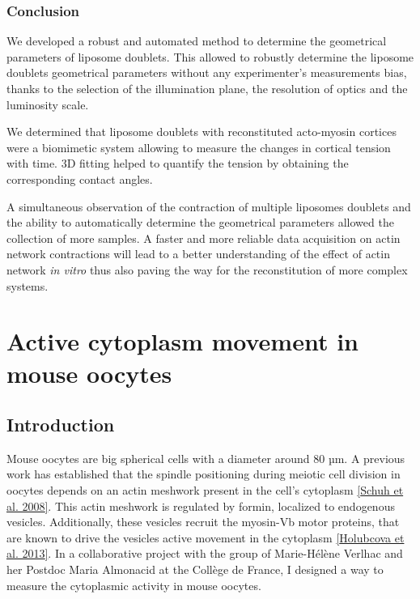 \documentclass[A4paperpaper,11pt,english]{sphinxmanual}
\begin{document}
\subsection{Conclusion}
\label{index-latex:id25}
We developed a robust and automated method to determine the geometrical
parameters of liposome doublets. This allowed to robustly determine the
liposome doublets geometrical parameters without
any experimenter’s measurements bias, thanks to the selection of the illumination plane,
the resolution of optics and the luminosity scale.

We determined that liposome doublets with reconstituted acto-myosin cortices were
a biomimetic system allowing to measure the changes in cortical tension with
time. 3D fitting helped to quantify the tension by obtaining the corresponding contact angles.

A simultaneous observation of the contraction of multiple liposomes doublets and the
ability to automatically determine the geometrical parameters allowed the collection of more
samples. A faster and more reliable data acquisition on actin
network contractions will lead to a better understanding of the effect of actin
network \emph{in vitro} thus also paving the way for the reconstitution of more complex systems.


\chapter{Active cytoplasm movement in mouse oocytes}
\label{index-latex::doc}\label{index-latex:active-cytoplasm-movement-in-mouse-oocytes}

\section{Introduction}
\label{index-latex:introduction}
Mouse oocytes are big spherical cells with a diameter around 80 µm.  A previous work has established
that the spindle positioning during meiotic cell division in oocytes depends
on an actin meshwork present in the cell's cytoplasm {\hyperref[index-latex:schuh2008]{{[}Schuh et al. 2008{]}}}.  This
actin meshwork is regulated by formin, localized to endogenous vesicles.
Additionally, these vesicles recruit the myosin-Vb motor proteins, that are known to drive the vesicles active movement
in the cytoplasm {\hyperref[index-latex:holubcova2013]{{[}Holubcova et al. 2013{]}}}. In a collaborative project with the group of Marie-Hélène Verlhac
and her Postdoc Maria Almonacid at the Collège de France, I designed a way to measure the cytoplasmic activity in mouse oocytes.
\end{document}
